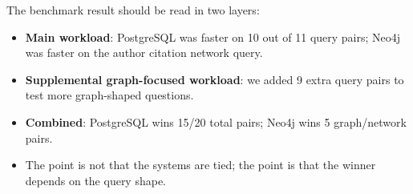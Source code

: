 \documentclass[11pt]{article}
\begin{document}
The benchmark result should be read in two layers:

\begin{itemize}
    \item \textbf{Main workload}: PostgreSQL was faster on 10 out of 11 query pairs; Neo4j was faster on the author citation network query.
    \item \textbf{Supplemental graph-focused workload}: we added 9 extra query pairs to test more graph-shaped questions.
    \item \textbf{Combined}: PostgreSQL wins 15/20 total pairs; Neo4j wins 5 graph/network pairs.
    \item The point is not that the systems are tied; the point is that the winner depends on the query shape.
\end{itemize}
\end{document}
